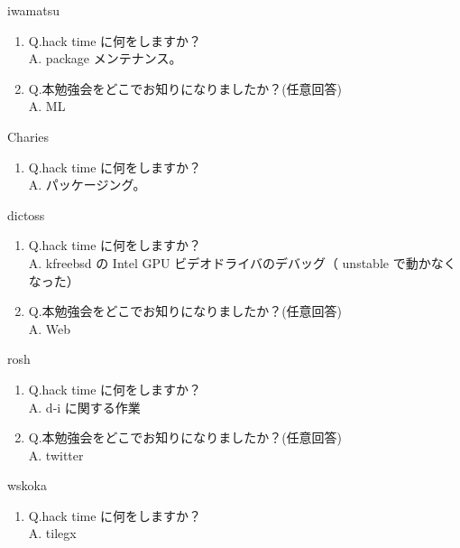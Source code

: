 \begin{prework}{ iwamatsu }
  \begin{enumerate}
  \item Q.hack time に何をしますか？\\
    A. package メンテナンス。
  \item Q.本勉強会をどこでお知りになりましたか？(任意回答)\\
    A. ML
  \end{enumerate}
\end{prework}

\begin{prework}{ Charies }
  \begin{enumerate}
  \item Q.hack time に何をしますか？\\
    A. パッケージング。
  \end{enumerate}
\end{prework}

\begin{prework}{ dictoss }
  \begin{enumerate}
  \item Q.hack time に何をしますか？\\
    A. kfreebsd の Intel GPU ビデオドライバのデバッグ（ unstable で動かなくなった）
  \item Q.本勉強会をどこでお知りになりましたか？(任意回答)\\
    A. Web
  \end{enumerate}
\end{prework}

\begin{prework}{ rosh }
  \begin{enumerate}
  \item Q.hack time に何をしますか？\\
    A. d-i に関する作業
  \item Q.本勉強会をどこでお知りになりましたか？(任意回答)\\
    A. twitter
  \end{enumerate}
\end{prework}

\begin{prework}{ wskoka }
  \begin{enumerate}
  \item Q.hack time に何をしますか？\\
    A. tilegx
  \end{enumerate}
\end{prework}

